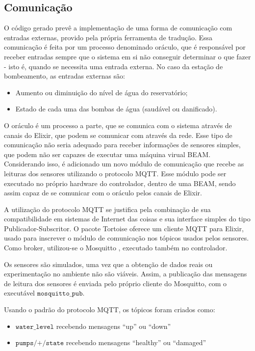 \documentclass[12pt]{article}
\begin{document}
\subsection{Comunicação}

O código gerado prevê a implementação de uma forma de comunicação com entradas
externas, provido pela própria ferramenta de tradução. Essa comunicação é feita
por um processo denominado oráculo, que é responsável por receber entradas
sempre que o sistema em si não conseguir determinar o que fazer - isto é, quando
se necessita uma entrada externa. No caso da estação de bombeamento, as entradas
externas são:

\begin{itemize}
\item Aumento ou diminuição do nível de água do reservatório;
\item Estado de cada uma das bombas de água (saudável ou danificado).
\end{itemize}

O oráculo é um processo a parte, que se comunica com o sistema através de canais
do Elixir, que podem se comunicar com através da rede. Esse tipo de comunicação
não seria adequado para receber informações de sensores simples, que podem não
ser capazes de executar uma máquina virual BEAM. Considerando isso, é adicionado
um novo módulo de comunicação que recebe as leituras dos sensores utilizando o
protocolo MQTT. Esse módulo pode ser executado no próprio hardware do
controlador, dentro de uma BEAM, sendo assim capaz de se comunicar com o oráculo
pelos canais de Elixir.

A utilização do protocolo MQTT se justifica pela combinação de sua
compatibilidade em sistemas de Internet das coisas e sua interface simples do
tipo Publicador-Subscritor. O pacote Tortoise \cite{tortoise} oferece um cliente
MQTT para Elixir, usado para inscrever o módulo de comunicação nos tópicos
usados pelos sensores. Como broker, utilizou-se o Mosquitto \cite{mosquitto},
executado também no controlador.

Os sensores são simulados, uma vez que a obtenção de dados reais ou
experimentação no ambiente não são viáveis. Assim, a publicação das mensagens de
leitura dos sensores é enviada pelo próprio cliente do Mosquitto, com o
executável $\texttt{mosquitto\_pub}$.

Usando o padrão do protocolo MQTT, os tópicos foram criados como:
\begin{itemize}
  \item $\texttt{water\_level}$ recebendo mensagens ``up'' ou ``down''
  \item $\texttt{pumps/+/state}$ recebendo mensagens ``healthy'' ou ``damaged''
\end{itemize}
\end{document}
